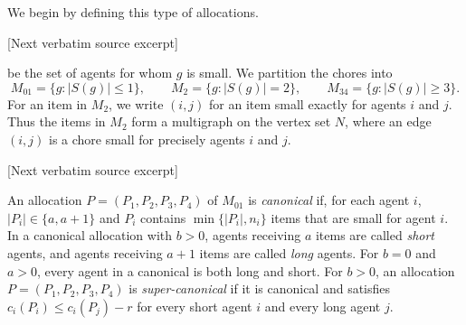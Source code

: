 \documentclass[10pt]{article}
\begin{document}
\begin{ReviewVerbatim}
We begin by defining this type of allocations.


[Next verbatim source excerpt]

be the set of agents for whom $g$ is small.  We partition the chores into
\[
M_{01}=\{g:|S(g)|\le 1\},\qquad
M_2=\{g:|S(g)|=2\},\qquad
M_{34}=\{g:|S(g)|\ge 3\}.
\]
For an item in $M_2$, we write $(i,j)$ for an item small exactly for agents
$i$ and $j$.  Thus the items in $M_2$ form a multigraph on the vertex set
$N$, where an edge $(i,j)$ is a chore small for precisely agents $i$ and $j$.

[Next verbatim source excerpt]

\begin{definition}
    An allocation $P=(P_1,P_2,P_3,P_4)$ of $M_{01}$ is \emph{canonical} if, for each agent $i$, $|P_i|\in\{a,a+1\}$ and $P_i$ contains $\min\{|P_i|, n_i\}$ items that are small for agent $i$.
    In a canonical allocation with $b>0$, agents receiving $a$ items are called \emph{short} agents, and agents receiving $a+1$ items are called \emph{long} agents.
    For $b=0$ and $a>0$, every agent in a canonical is both long and short.
    For $b>0$, an allocation $P=(P_1,P_2,P_3,P_4)$ is \emph{super-canonical} if it is canonical and satisfies $c_i(P_i)\leq c_i(P_j)-r$ for every short agent $i$ and every long agent $j$.
\end{definition}
\end{ReviewVerbatim}
\end{document}
